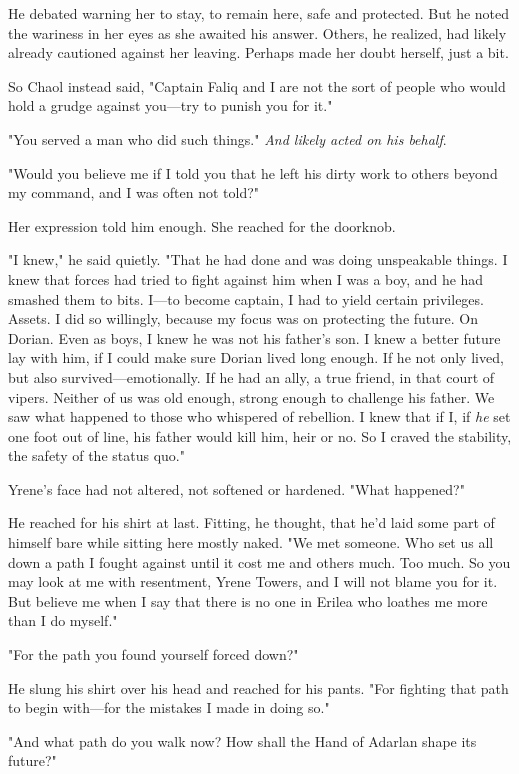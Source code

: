 He debated warning her to stay, to remain here, safe and protected. But he noted the wariness in her eyes as she awaited his answer. Others, he realized, had likely already cautioned against her leaving. Perhaps made her doubt herself, just a bit.

So Chaol instead said, "Captain Faliq and I are not the sort of people who would hold a grudge against you---try to punish you for it."

"You served a man who did such things." \emph{And likely acted on his behalf}.

"Would you believe me if I told you that he left his dirty work to others beyond my command, and I was often not told?"

Her expression told him enough. She reached for the doorknob.

"I knew," he said quietly. "That he had done and was doing unspeakable things. I knew that forces had tried to fight against him when I was a boy, and he had smashed them to bits. I---to become captain, I had to yield certain  privileges. Assets. I did so willingly, because my focus was on protecting the future. On Dorian. Even as boys, I knew he was not his father's son. I knew a better future lay with him, if I could make sure Dorian lived long enough. If he not only lived, but also survived---emotionally. If he had an ally, a true friend, in that court of vipers. Neither of us was old enough, strong enough to challenge his father. We saw what happened to those who whispered of rebellion. I knew that if I, if \emph{he} set one foot out of line, his father would kill him, heir or no. So I craved the stability, the safety of the status quo."

Yrene's face had not altered, not softened or hardened. "What happened?"

He reached for his shirt at last. Fitting, he thought, that he'd laid some part of himself bare while sitting here mostly naked. "We met someone. Who set us all down a path I fought against until it cost me and others much. Too much. So you may look at me with resentment, Yrene Towers, and I will not blame you for it. But believe me when I say that there is no one in Erilea who loathes me more than I do myself."

"For the path you found yourself forced down?"

He slung his shirt over his head and reached for his pants. "For fighting that path to begin with---for the mistakes I made in doing so."

"And what path do you walk now? How shall the Hand of Adarlan shape its future?"


